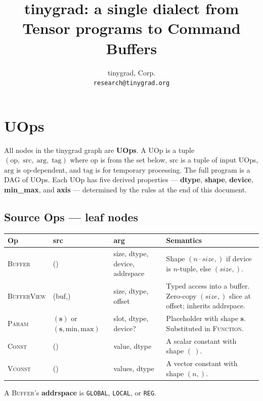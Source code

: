 \documentclass[10pt,letterpaper]{article}
\title{tinygrad: a single dialect from Tensor programs to Command Buffers}
\author{tinygrad, Corp. \\ \texttt{research@tinygrad.org}}
\date{}
\newcommand{\op}[1]{\textsc{#1}}
\begin{document}
\maketitle
\thispagestyle{empty}

\section*{UOps}

All nodes in the tinygrad graph are \textbf{UOps}. A UOp is a tuple $(\mathrm{op},\;\mathrm{src},\;\mathrm{arg},\;\mathrm{tag})$ where $\mathrm{op}$ is from the set below, $\mathrm{src}$ is a tuple of input UOps, $\mathrm{arg}$ is op-dependent, and $\mathrm{tag}$ is for temporary processing. The full program is a DAG of UOps. Each UOp has five derived properties --- \textbf{dtype}, \textbf{shape}, \textbf{device}, \textbf{min\_max}, and \textbf{axis} --- determined by the rules at the end of this document.

\subsection*{Source Ops \normalfont\small--- leaf nodes}

\begin{tabular}{@{}l p{3.2cm} p{3.0cm} p{6.2cm}@{}}
\toprule
\textbf{Op} & \textbf{src} & \textbf{arg} & \textbf{Semantics} \\
\midrule
\op{Buffer} & () & size, dtype, device, addrspace &
  Shape $(n \cdot \textit{size},)$ if device is $n$-tuple, else $(\textit{size},)$. \\
\op{BufferView} & (buf,) & size, dtype, offset &
  Typed access into a buffer. Zero-copy $(\textit{size},)$ slice at offset; inherits addrspace. \\
\op{Param} & $(\mathbf{s})$ or $(\mathbf{s}, \text{min}, \text{max})$ & slot, dtype, device? &
  Placeholder with shape $\mathbf{s}$. Substituted in \op{Function}. \\[4pt]
\op{Const} & () & value, dtype &
  A scalar constant with shape $(\ )$. \\
\op{Vconst} & () & values, dtype &
  A vector constant with shape $(n,)$. \\
\bottomrule
\end{tabular}

\smallskip
A \op{Buffer}'s \textbf{addrspace} is \texttt{GLOBAL}, \texttt{LOCAL}, or \texttt{REG}.
\end{document}
